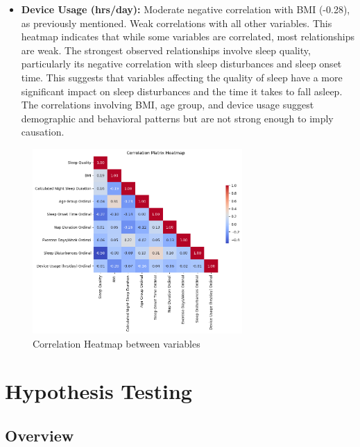 \documentclass[conference]{IEEEtran}
\begin{document}
\begin{itemize}
    \item \textbf{Device Usage (hrs/day):} Moderate negative correlation with BMI (-0.28), as previously mentioned.
          Weak correlations with all other variables.
          This heatmap indicates that while some variables are correlated, most relationships are weak. The strongest observed relationships involve sleep quality, particularly its negative correlation with sleep disturbances and sleep onset time. This suggests that variables affecting the quality of sleep have a more significant impact on sleep disturbances and the time it takes to fall asleep. The correlations involving BMI, age group, and device usage suggest demographic and behavioral patterns but are not strong enough to imply causation.
\end{itemize}
\begin{figure}[ht]
    \centering
    \includegraphics[width=8cm]{images/corrheat.png}
    \caption{Correlation Heatmap between variables}
    \label{fig:corrheat}
\end{figure}
\section{Hypothesis Testing}
\subsection*{Overview}
\end{document}
